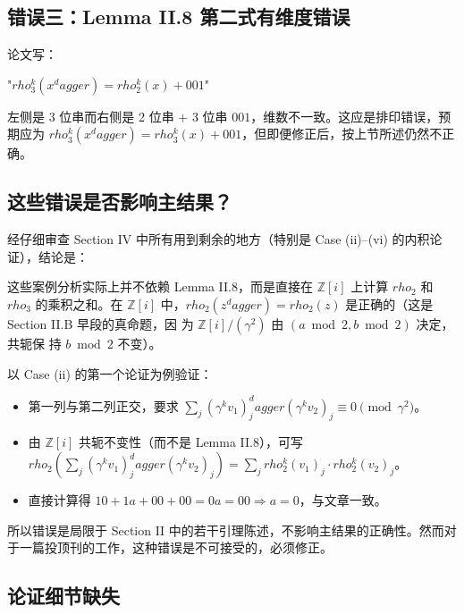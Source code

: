 \documentclass[10pt,a4paper]{article}
\def\rho{rho}%
\def\dagger{dagger}%
\begin{document}
\subsection{错误三：Lemma II.8  第二式有维度错误}
 
论文写：
 
"$\rho_3^k(x^\dagger) = \rho_2^k(x) + 001$"
 
左侧是 3 位串而右侧是 2 位串 $+$ 3 位串 $001$，维数不一致。这应是排印错误，预期应为 $\rho_3^k(x^\dagger) = \rho_3^k(x) + 001$，但即便修正后，按上节所述仍然不正确。


\subsection{这些错误是否影响主结果？}
 
经仔细审查 Section IV 中所有用到剩余的地方（特别是 Case (ii)--(vi) 的内积论证），结论是：
 
这些案例分析实际上并不依赖 Lemma II.8，而是直接在 $\mathbb{Z}[i]$ 上计算 $\rho_2$
和 $\rho_3$ 的乘积之和。在 $\mathbb{Z}[i]$ 中，$\rho_2(z^\dagger) =
\rho_2(z)$ 是正确的（这是 Section II.B 早段的真命题，因
为 $\mathbb{Z}[i]/(\gamma^2)$ 由 $(a \bmod 2, b \bmod 2)$ 决定，共轭保
持 $b \bmod 2$ 不变）。
 
以 Case (ii) 的第一个论证为例验证：
\begin{itemize}
\item 第一列与第二列正交，要求 $\sum_j (\gamma^k v_1)_j^\dagger (\gamma^k v_2)_j \equiv 0 \pmod{\gamma^2}$。
\item 由 $\mathbb{Z}[i]$ 共轭不变性（而不是 Lemma II.8），可写 $\rho_2\!\left(\sum_j (\gamma^k v_1)_j^\dagger (\gamma^k v_2)_j\right) = \sum_j \rho_2^k(v_1)_j \cdot \rho_2^k(v_2)_j$。
\item 直接计算得 $10 + 1a + 00 + 00 = 0a = 00 \Rightarrow a = 0$，与文章一致。
\end{itemize}
 
所以错误是局限于 Section II 中的若干引理陈述，不影响主结果的正确性。然而对于一篇投顶刊的工作，这种错误是不可接受的，必须修正。
 
\subsection{论证细节缺失}
 
\end{document}
